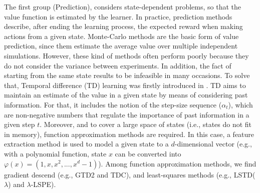 \documentclass[12pt, a4paper,twoside]{tesi_upf}
\begin{document}
			The first group (Prediction), considers state-dependent problems, so that the value function is estimated by the learner. In practice, prediction methods describe, after ending the learning process, the expected reward when making actions from a given state. Monte-Carlo methods \cite{robert2004monte} are the basic form of value prediction, since them estimate the average value over multiple independent simulations. However, these kind of methods often perform poorly because they do not consider the variance between experiments. In addition, the fact of starting from the same state results to be infeasible in many occasions. To solve that, Temporal difference (TD) learning was firstly introduced in \cite{sutton1988learning}. TD aims to maintain an estimate of the value in a given state by means of considering past information. For that, it includes the notion of the step-size sequence ($\alpha_t$), which are non-negative numbers that regulate the importance of past information in a given step $t$. Moreover, and to cover a large space of states (i.e., states do not fit in memory), function approximation methods are required. In this case, a feature extraction method is used to model a given state to a $d$-dimensional vector (e.g., with a polynomial function, state $x$ can be converted into $\varphi(x) = (1, x, x^2, ..., x^d-1)$).  Among function approximation methods, we find gradient descend (e.g., GTD2 and TDC), and least-squares methods (e.g., LSTD($\lambda$) and $\lambda$-LSPE).
			
\end{document}
